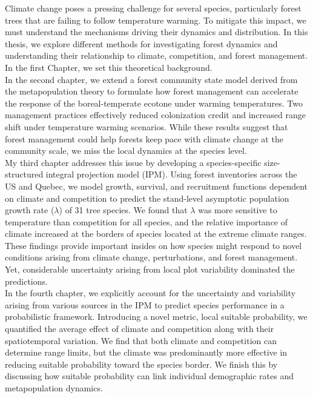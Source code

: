 Climate change poses a pressing challenge for several species, particularly forest trees that are failing to follow temperature warming. To mitigate this impact, we must understand the mechanisms driving their dynamics and distribution. In this thesis, we explore different methods for investigating forest dynamics and understanding their relationship to climate, competition, and forest management. In the first Chapter, we set this theoretical background.\\

In the second chapter, we extend a forest community state model derived from the metapopulation theory to formulate how forest management can accelerate the response of the boreal-temperate ecotone under warming temperatures. Two management practices effectively reduced colonization credit and increased range shift under temperature warming scenarios. While these results suggest that forest management could help forests keep pace with climate change at the community scale, we miss the local dynamics at the species level.\\

My third chapter addresses this issue by developing a species-specific size-structured integral projection model (IPM). Using forest inventories across the US and Quebec, we model growth, survival, and recruitment functions dependent on climate and competition to predict the stand-level asymptotic population growth rate ($\lambda$) of 31 tree species. We found that $\lambda$ was more sensitive to temperature than competition for all species, and the relative importance of climate increased at the borders of species located at the extreme climate ranges. These findings provide important insides on how species might respond to novel conditions arising from climate change, perturbations, and forest management. Yet, considerable uncertainty arising from local plot variability dominated the predictions.\\

In the fourth chapter, we explicitly account for the uncertainty and variability arising from various sources in the IPM to predict species performance in a probabilistic framework. Introducing a novel metric, local suitable probability, we quantified the average effect of climate and competition along with their spatiotemporal variation. We find that both climate and competition can determine range limits, but the climate was predominantly more effective in reducing suitable probability toward the species border. We finish this by discussing how suitable probability can link individual demographic rates and metapopulation dynamics.\\


